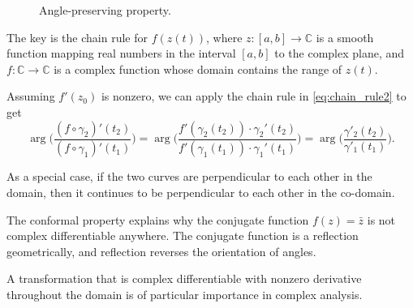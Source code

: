 \begin{figure}
\begin{center}
		
		
	\end{center}
	\caption{Angle-preserving property.}
	\label{fig:conformal_map_proof}
\end{figure}

The key is the chain rule for $f(z(t))$, where $z:[a,b]\to \mathbb{C}$ is a smooth function mapping real numbers in the interval $[a,b]$ to the complex plane, and $f:\mathbb{C} \to \mathbb{C}$ is a complex function whose domain contains the range of $z(t)$.




Assuming $f'(z_0)$ is nonzero, we can apply the chain rule in \eqref{eq:chain_rule2} to get
$$
\arg\Big( \frac{(f \circ\gamma_2)'(t_2)}{(f\circ \gamma_1)'(t_1)} \Big)
= \arg\Big(  \frac{f'(\gamma_2(t_2))\cdot\gamma_2'(t_2)}{f'(\gamma_1(t_1))\cdot\gamma_1'(t_1)} \Big) = \arg\Big( \frac{\gamma'_2(t_2)}{\gamma'_1(t_1)} \Big).
$$


As a special case, if the two curves are perpendicular to each other in the domain, then it continues to be perpendicular to each other in the co-domain.

The conformal property explains why the conjugate function $f(z) = \bar{z}$ is not complex differentiable anywhere. The conjugate function is a reflection geometrically, and reflection reverses the orientation of angles. 


A transformation that is complex differentiable with nonzero derivative throughout the domain is of particular importance in complex analysis.

